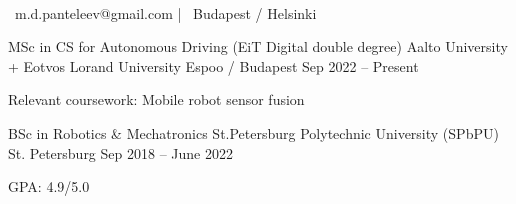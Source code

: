 \documentclass[]{awesome-cv}
\begin{document}
    
\begin{center}
	  \\
	\vspace{2mm}
	{\faEnvelope\ m.d.panteleev@gmail.com} | {\faMapMarker\ Budapest / Helsinki}
\end{center}
\begin{cventries}
\cventry
	{MSc in CS for Autonomous Driving (EiT Digital double degree)}
	{Aalto University + Eotvos Lorand University}
	{Espoo / Budapest}
	{Sep 2022 – Present}
	{ 
	\begin{cvitems}
		\item {Relevant coursework: Mobile robot sensor fusion}
	\end{cvitems}}

	\cventry
	{BSc in Robotics \& Mechatronics}
	{St.Petersburg Polytechnic University (SPbPU)}
	{St. Petersburg}
	{Sep 2018 – June 2022}
	{
	\begin{cvitems}
		\item {GPA: 4.9/5.0}
	\end{cvitems}}

\end{cventries}
\end{document}
